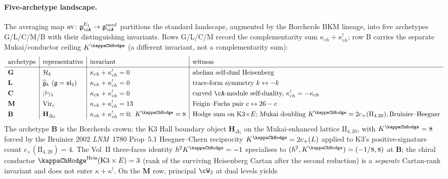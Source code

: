 \paragraph{Five-archetype landscape.}
The averaging map
$\mathrm{av}\colon \mathfrak g^{E_1}_\cA \to
\mathfrak g^{\mathrm{mod}}_\cA$ partitions the standard
landscape, augmented by the Borcherds BKM lineage, into five
archetypes G/L/C/M/B with their distinguishing invariants. Rows
G/L/C/M record the complementarity sum $\kappa_{ch} + \kappa_{ch}^!$;
row B carries the separate Mukai/conductor ceiling
$K^{\kappaChHodge}$ (a different invariant, not a complementarity
sum):
\[
\renewcommand{\arraystretch}{1.3}
\begin{array}{l|l|l|l}
\text{archetype} & \text{representative} & \text{invariant} &
 \text{witness} \\
\hline
\mathbf{G} & \cH_k & \kappa_{ch} + \kappa_{ch}^! = 0 &
 \text{abelian self-dual Heisenberg} \\
\mathbf{L} & \widehat{\fg}_k\ (\fg = \mathfrak{sl}_2) &
 \kappa_{ch} + \kappa_{ch}^! = 0 &
 \text{trace-form symmetry } k \leftrightarrow -k \\
\mathbf{C} & \beta\gamma_\lambda &
 \kappa_{ch} + \kappa_{ch}^! = 0 &
 \text{curved $\cA$-module self-duality, } \kappa_{ch}^! = -\kappa_{ch} \\
\mathbf{M} & \mathrm{Vir}_c & \kappa_{ch} + \kappa_{ch}^! = 13 &
 \text{Feigin--Fuchs pair } c \leftrightarrow 26 - c \\
\mathbf{B} & \mathbf H_{\Delta_5} &
 \kappa_{ch} + \kappa_{ch}^! = 0;\ K^{\kappaChHodge} = 8 &
 \text{Hodge sum on K3$\times E$; Mukai doubling } K^{\kappaChHodge}
 = 2c_+(\mathrm{II}_{4,20}),
 \text{Bruinier--Heegner}
\end{array}
\]
The archetype $\mathbf{B}$ is the Borcherds crown: the K3 Hall
boundary object $\mathbf H_{\Delta_5}$ on the Mukai-enhanced
lattice $\mathrm{II}_{4,20}$, with $K^{\kappaChHodge} = 8$ forced by the
Bruinier 2002 \emph{LNM}~1780 Prop~5.1 Heegner--Chern reciprocity
$K^{\kappaChHodge} = 2 c_+(L)$ applied to K3's positive-signature count
$c_+(\mathrm{II}_{4,20}) = 4$. The Vol~II three-faces identity
$\hbar^2 K^{\kappaChHodge} = -1$ specialises to
$(\hbar^2, K^{\kappaChHodge}) = (-1/8, 8)$ at
$\mathbf{B}$; the chiral conductor
$\kappaChHodge^{\mathrm{Heis}}(\mathrm{K3}\times E) = 3$
(rank of the surviving Heisenberg Cartan after the second reduction)
is a \emph{separate} Cartan-rank invariant and does not enter
$\kappa + \kappa^!$.
On the $\mathbf{M}$ row, principal $\cW_3$ at dual levels yields
